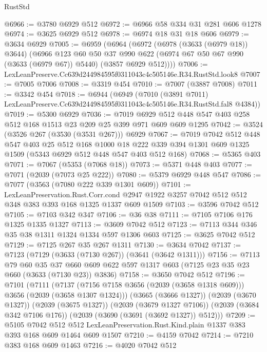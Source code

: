 \begin{lexlean}{RustStd}
\begin{coremodule}
@6966 := @3780 @6929 @512
@6972 := @6966 @58 @334 @31 @281 @606 @1278
@6974 := @3625 @6929 @512
@6978 := @6974 @18 @31 @18 @606
@6979 := @3634 @6929
@7005 := @6959
    (@6964
      (@6972
        (@6978 (@3633 (@6979 @18)) @3644)
        (@6966
          @123
          @60
          @50
          @37
          @990
          @622
          (@6974 @67 @50 @67 @990 (@3633 (@6979 @67)) @5440)
          (@3857 @6929 @512))))
@7006 := LexLeanPreserve.Cc639d244984595f0311043c4c505146e.R34.RustStd.look8
@7007 := @7005 @7006
@7008 := @3319 @454
@7010 := @7007 (@3887 @7008)
@7011 := @3342 @454
@7018 := @6944
    (@6949
      (@7010
        (@3891 @7011)
        LexLeanPreserve.Cc639d244984595f0311043c4c505146e.R34.RustStd.fal8
        @4384))
@7019 := @5300 @6929
@7036 := @7019 @6929 @512 @448 @547 @403 @258 @512 @168 @1513 @23 @209 @25 @399 @971 @609 @609 @1295
@7042 := @3524 (@3526 @267 (@3530 (@3531 @267))) @6929
@7067 := @7019
    @7042
    @512
    @448
    @547
    @403
    @25
    @512
    @168
    @1000
    @18
    @222
    @339
    @394
    @1301
    @609
    @1325
    @1509
    (@5343 @6929 @512 @448 @547 @403 @512 @168)
@7068 := @5365 @403
@7071 := @7067 (@5353 (@7068 @18))
@7073 := @5371 @448 @403
@7077 := @7071 (@2039 (@7073 @25 @222))
@7080 := @5379 @6929 @448 @547
@7086 := @7077 (@3563 (@7080 @222 @339 @1301 @609))
@7101 := LexLeanPreservation.Rust.Corr.cond
    @2947
    @1922
    @3257
    @7042
    @512
    @512
    @348
    @383
    @393
    @168
    @1325
    @1337
    @609
    @1509
@7103 := @3596 @7042 @512
@7105 := @7103 @342 @347
@7106 := @36 @38
@7111 := @7105 @7106 @176 @1325 @1335 @1327
@7113 := @3609 @7042 @512
@7123 := @7113 @344 @346 @35 @38 @1311 @1324 @1334 @597 @1306 @603
@7125 := @3625 @7042 @512
@7129 := @7125 @267 @35 @267 @1311
@7130 := @3634 @7042
@7137 := @7123 (@7129 (@3633 (@7130 @267)) (@3641 (@3642 @1311)))
@7156 := @7113
    @79
    @60
    @35
    @37
    @660
    @609
    @622
    @597
    @1317
    @603
    (@7125 @23 @35 @23 @660 (@3633 (@7130 @23)) @3836)
@7158 := @3650 @7042 @512
@7196 := @7101
    (@7111
      (@7137 (@7156 @7158 @3656 (@2039 (@3658 @1318 @609))) @3656 (@2039 (@3658 @1307 @1324)))
      (@3665 (@3666 @1327))
      (@2039 (@3670 @1327))
      (@2039 (@3675 @1327))
      (@2039 (@3679 @1327 @7106))
      (@2039 (@3684 @342 @7106 @176))
      (@2039 (@3690 (@3691 (@3692 @1327)) @512)))
@7209 := @5105
    @7042
    @512
    @512
    LexLeanPreservation.Rust.Kind.plain
    @1337
    @383
    @393
    @168
    @609
    @1464
    @609
    @1507
@7210 := @4159 @7042
@7214 := @7210 @383 @168 @609 @1463
@7216 := @4020 @7042 @512

\end{coremodule}
\end{lexlean}
